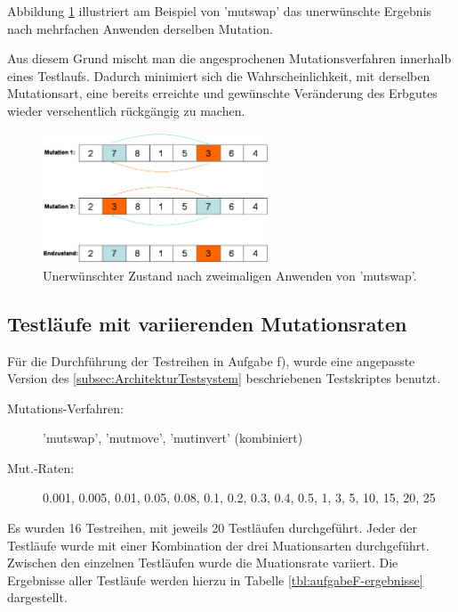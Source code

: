 Abbildung \ref{fig:MUTINVERTBackchange} illustriert am Beispiel von 'mutswap'
das unerwünschte Ergebnis nach mehrfachen Anwenden derselben Mutation.

Aus diesem Grund mischt man die angesprochenen Mutationsverfahren innerhalb
eines Testlaufs. Dadurch minimiert sich die Wahrscheinlichkeit, mit derselben
Mutationsart, eine bereits erreichte und gewünschte Veränderung des
Erbgutes wieder versehentlich rückgängig zu machen.
 
\begin{figure} 
  \centering
  \includegraphics[width=0.6\textwidth]{../images/picMUTINVERTBackchange}
  \caption{Unerwünschter Zustand nach zweimaligen Anwenden von 'mutswap'.}
  \label{fig:MUTINVERTBackchange}
\end{figure}

\subsection{Testläufe mit variierenden Mutationsraten}
\label{subsec:TestlaufeMuationsraten}
Für die Durchführung der Testreihen in Aufgabe f), wurde eine 
angepasste Version des \ref{subsec:ArchitekturTestsystem} beschriebenen
Testskriptes benutzt.

\begin{description}
  \item[Mutations-Verfahren:] 'mutswap', 'mutmove', 'mutinvert' (kombiniert)
  \item[Mut.-Raten:] 0.001, 0.005, 0.01, 0.05, 0.08, 0.1, 0.2, 0.3, 0.4, 0.5, 1, 3, 5, 10, 15, 20, 25
\end{description} 

Es wurden 16 Testreihen, mit jeweils 20 Testläufen durchgeführt. Jeder der
Testläufe wurde mit einer Kombination der drei Muationsarten durchgeführt.
Zwischen den einzelnen Testläufen wurde die Muationsrate variiert.
Die Ergebnisse aller Testläufe werden hierzu in Tabelle
\ref{tbl:aufgabeF-ergebnisse} dargestellt.

